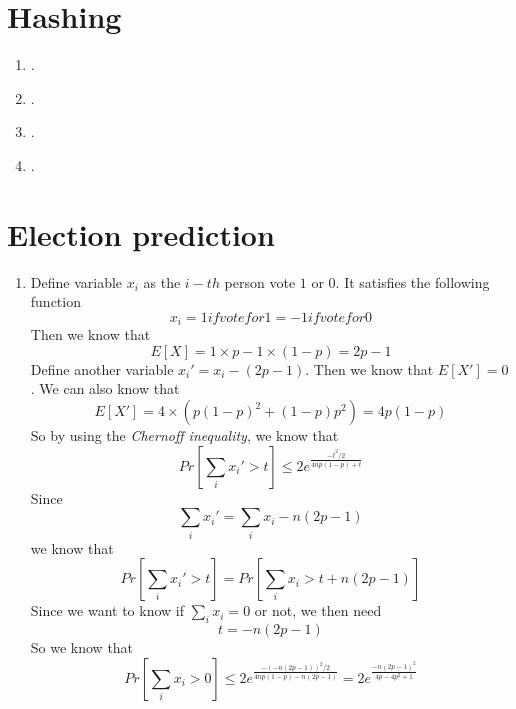 \documentclass{article}
\begin{document}
	\section{Hashing}
		\begin{enumerate}
			\item .
			\item .
			\item .
			\item .
		\end{enumerate}

	\section{Election prediction}
		\begin{enumerate}
			\item Define variable $x_i$ as the $i-th$ person vote $1$ or $0$. It satisfies the following function \begin{equation}
				x_i = 1 if vote for 1 = -1 if vote for 0
				\end{equation}Then we know that \begin{equation}
				E\left[X\right] = 1 \times p  -1 \times (1 - p) = 2p - 1
			\end{equation}
				Define another variable $x_i' = x_i - (2p - 1)$. Then we know that $E[X'] = 0$. We can also know that \begin{equation}
					E\left[X'\right] = 4 \times (p(1-p)^2 + (1 - p)p^2) = 4p(1 - p)
				\end{equation}
				So by using the \emph{Chernoff inequality}, we know that \begin{equation}
					Pr\left[\sum_ix_i' >t \right] \leq 2e^{\frac{-t^2/2}{4np(1 - p) + t}}
				\end{equation}
				Since \begin{equation}
					\sum_i x_i' = \sum_i x_i - n(2p - 1)
				\end{equation}
				we know that \begin{equation}
					Pr\left[\sum_i x_i' > t\right] = Pr\left[\sum_i x_i > t + n(2p - 1)\right]
				\end{equation}
				Since we want to know if $\sum_i x_i = 0$ or not, we then need \begin{equation}
					t = -n(2p - 1)
				\end{equation}
				So we know that \begin{equation}
					Pr\left[\sum_ix_i > 0\right] \leq 2e^{\frac{-(-n(2p - 1))^2 / 2}{4np(1 - p) - n(2p - 1)}}
					= 2e^{\frac{-n(2p - 1)^2}{4p - 4p^2 + 1}}

\end{equation}
\end{enumerate}
\end{document}
